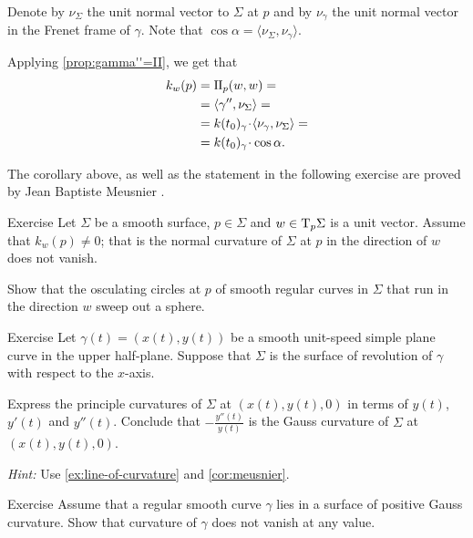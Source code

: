Denote by $\nu_\Sigma$ the unit normal vector to $\Sigma$ at $p$ 
and by $\nu_\gamma$ the unit normal vector in the Frenet frame of $\gamma$.
Note that $\cos\alpha=\langle\nu_\Sigma,\nu_\gamma\rangle$.

Applying \ref{prop:gamma''=II}, we get that
\begin{align*}
k_{w}(p)&=\II_p(w,w) =
\\
&=\langle\gamma'',\nu_\Sigma\rangle=
\\
&=\kur(t_0)_\gamma\cdot\langle\nu_\gamma,\nu_\Sigma\rangle=
\\
&=\kur(t_0)_\gamma\cdot\cos\alpha.
\end{align*}
\qedsf

The corollary above, as well as the statement in the following exercise are proved by Jean Baptiste Meusnier \cite{meusnier}.

\begin{thm}{Exercise}\label{ex:meusnier}
Let $\Sigma$ be a smooth surface, $p\in\Sigma$ and $w\in \mathrm{T}_p\Sigma$ is a unit vector.
Assume that $k_w(p)\ne 0$; that is the normal curvature of $\Sigma$ at $p$ in the direction of $w$ does not vanish.

Show that the osculating circles at $p$ of smooth regular curves in $\Sigma$ that run in the direction $w$ sweep out a sphere. 
\end{thm}

\begin{thm}{Exercise}\label{ex:principle-revolution}
Let $\gamma(t)=(x(t),y(t))$ be a smooth unit-speed simple plane curve in the upper half-plane.
Suppose that $\Sigma$ is the surface of revolution of $\gamma$ with respect to the $x$-axis.

Express the principle curvatures of $\Sigma$ at $(x(t),y(t),0)$ in terms of $y(t)$, $y'(t)$ and $y''(t)$.
Conclude that $-\tfrac{y''(t)}{y(t)}$ is the Gauss curvature of $\Sigma$ at $(x(t),y(t),0)$.
\end{thm}

\textit{Hint:} Use \ref{ex:line-of-curvature} and \ref{cor:meusnier}.

\begin{thm}{Exercise}
Assume that a regular smooth curve $\gamma$ lies in a surface of positive Gauss curvature.
Show that curvature of $\gamma$ does not vanish at any value.
\end{thm}
